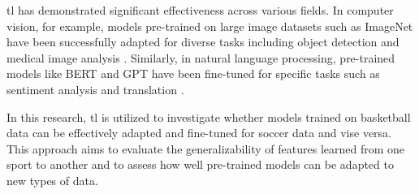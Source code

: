 \gls{tl} has demonstrated significant effectiveness across various fields. In computer vision, for example, models pre-trained on large image datasets such as ImageNet have been successfully adapted for diverse tasks including object detection and medical image analysis \cite{pan2009survey, GoodBengCour16}. Similarly, in natural language processing, pre-trained models like BERT and GPT have been fine-tuned for specific tasks such as sentiment analysis and translation \cite{bert, radford2019language}.

In this research, \gls{tl} is utilized to investigate whether models trained on basketball data can be effectively adapted and fine-tuned for soccer data and vise versa. This approach aims to evaluate the generalizability of features learned from one sport to another and to assess how well pre-trained models can be adapted to new types of data.
